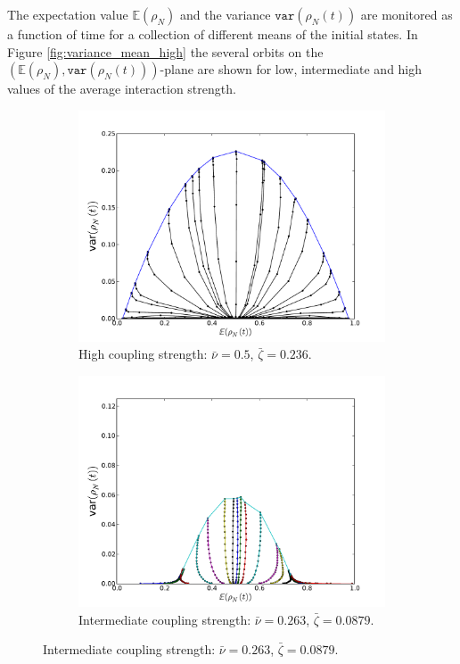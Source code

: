 \documentclass[]{article}
\begin{document}
The expectation value $\mathbb{E}(\rho_N)$ and the variance $\texttt{var}(\rho_N(t))$ are monitored as a function of time for a collection of different means of the initial states. In Figure \ref{fig:variance_mean_high} the several orbits on the $(\mathbb{E}(\rho_N),\texttt{var}(\rho_N(t)))$-plane are shown for low, intermediate and high values of the average interaction strength.  


\pagestyle{empty}

\begin{figure}
\centering
\begin{subfigure}[b]{0.7\textwidth}
\includegraphics[width=\textwidth]{variance_mean_N1000_M500_fully_connected_20timesteps.pdf}
\caption{High coupling strength:  $\bar{\nu}=0.5$, $\bar{\zeta}=0.236$.}
\label{fig:fig:variance_mean_high}
\end{subfigure}

\begin{subfigure}[b]{0.7\textwidth}
\includegraphics[width=\textwidth]{variance_mean_N1000_M500_intermediate_fully_20timesteps.pdf}
\caption{ Intermediate coupling strength: $\bar{\nu}=0.263$, $\bar{\zeta}=0.0879$.}
\label{fig:fig:variance_mean_inter}
\end{subfigure}


\end{figure}
\end{document}
